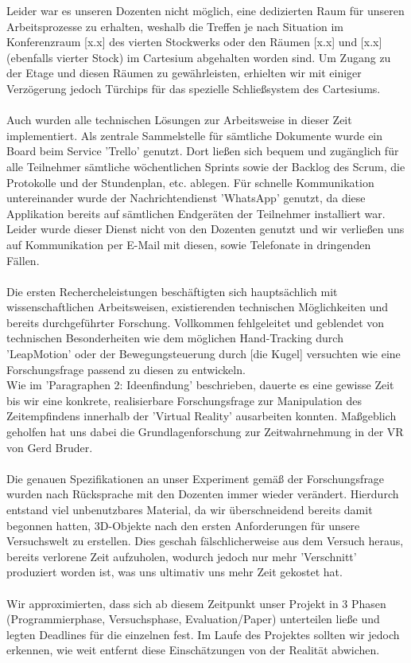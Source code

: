 \documentclass{Bericht}
\begin{document}
Leider war es unseren Dozenten nicht möglich, eine dedizierten Raum für unseren Arbeitsprozesse zu erhalten, weshalb die Treffen je nach Situation im Konferenzraum [x.x] des vierten Stockwerks oder den Räumen [x.x] und [x.x](ebenfalls vierter Stock) im Cartesium abgehalten worden sind. Um Zugang zu der Etage und diesen Räumen zu gewährleisten, erhielten wir mit einiger Verzögerung jedoch Türchips für das spezielle Schließsystem des Cartesiums.\\
\\
Auch wurden alle technischen Lösungen zur Arbeitsweise in dieser Zeit implementiert. Als zentrale Sammelstelle für sämtliche Dokumente wurde ein Board beim Service 'Trello' genutzt. Dort ließen sich bequem und zugänglich für alle Teilnehmer sämtliche wöchentlichen Sprints sowie der Backlog des Scrum, die Protokolle und der Stundenplan, etc. ablegen. Für schnelle Kommunikation untereinander wurde der Nachrichtendienst 'WhatsApp' genutzt, da diese Applikation bereits auf sämtlichen Endgeräten der Teilnehmer installiert war. Leider wurde dieser Dienst nicht von den Dozenten genutzt und wir verließen uns auf Kommunikation per E-Mail mit diesen, sowie Telefonate in dringenden Fällen.\\
\\
Die ersten Rechercheleistungen beschäftigten sich hauptsächlich mit wissenschaftlichen Arbeitsweisen, existierenden technischen Möglichkeiten und bereits durchgeführter Forschung. Vollkommen fehlgeleitet und geblendet von technischen Besonderheiten wie dem möglichen Hand-Tracking durch 'LeapMotion' oder der Bewegungsteuerung durch [die Kugel] versuchten wie eine Forschungsfrage passend zu diesen zu entwickeln.\\
Wie im 'Paragraphen 2: Ideenfindung' beschrieben, dauerte es eine gewisse Zeit bis wir eine konkrete, realisierbare Forschungsfrage zur Manipulation des Zeitempfindens innerhalb der 'Virtual Reality' ausarbeiten konnten. Maßgeblich geholfen hat uns dabei die Grundlagenforschung zur Zeitwahrnehmung in der VR von Gerd Bruder.\\
\\
Die genauen Spezifikationen an unser Experiment gemäß der Forschungsfrage wurden nach Rücksprache mit den Dozenten immer wieder verändert. Hierdurch entstand viel unbenutzbares Material, da wir überschneidend bereits damit begonnen hatten, 3D-Objekte nach den ersten Anforderungen für unsere Versuchswelt zu erstellen. Dies geschah fälschlicherweise aus dem Versuch heraus, bereits verlorene Zeit aufzuholen, wodurch jedoch nur mehr 'Verschnitt' produziert worden ist, was uns ultimativ uns mehr Zeit gekostet hat.\\
\\
Wir approximierten, dass sich ab diesem Zeitpunkt unser Projekt in 3 Phasen (Programmierphase, Versuchsphase, Evaluation/Paper) 	unterteilen ließe und legten Deadlines für die einzelnen fest. Im Laufe des Projektes sollten wir jedoch erkennen, wie weit entfernt diese Einschätzungen von der Realität abwichen.
\end{document}
